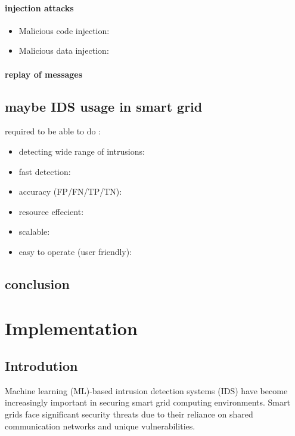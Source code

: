 \subsubsection{injection attacks}
\begin{itemize}
	\item Malicious code injection:
	\item Malicious data injection:
\end{itemize}

\subsubsection{replay of messages}






\section{maybe IDS usage in smart grid}
required to be able to do :

\firmlist
\begin{itemize}
	\item detecting wide range of intrusions: 
	\item fast detection: 
	\item accuracy (FP/FN/TP/TN): 
	\item resource effecient: 
	\item scalable: 
	\item easy to operate (user friendly): 
\end{itemize}




\section{conclusion}













\chapter{Implementation} \label{chap:Implementation}
\section{Introdution}
Machine learning (ML)-based intrusion detection systems (IDS) have become increasingly important in securing smart grid computing environments. Smart grids face significant security threats due to their reliance on shared communication networks and unique vulnerabilities.

